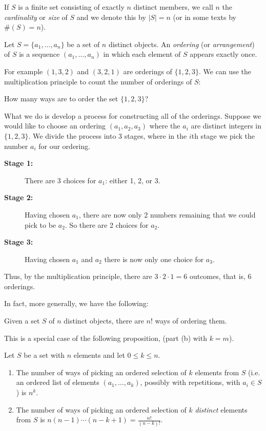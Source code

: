 \documentclass[11pt,dvipsnames]{book}
\numberwithin{figure}{section} %
\numberwithin{table}{section} %
\begin{document}
If $S$ is a finite set consisting of exactly $n$ distinct members, we call $n$ the {\em cardinality}
or {\em size} of $S$ and we denote this by $|S| = n$ (or in some texts by $\#(S) =n$).

\begin{definition}
Let $S = \{a_1, \dots , a_n\}$ be a set of $n$ distinct objects. An {\it ordering} (or {\it arrangement}) of $S$ is a sequence $(a_{1}, \dots ,a_{n})$ in which each element of $S$ appears exactly once.
\end{definition}

For example $(1,3,2)$ and $(3,2,1)$ are orderings of $\{1,2,3\}$. We can use the multiplication principle to count the number of orderings of $S$:

\begin{example}
How many ways are to order the set $\{1,2,3\}$?

What we do is develop a process for constructing all of the orderings. Suppose we would like to choose an ordering $(a_{1},a_{2},a_{3})$ where the $a_{i}$ are distinct integers in $\{1, 2, 3\}$. We divide the process into 3 stages, where in the $i$th stage we pick the number $a_{i}$ for our ordering.
\begin{description}
\item[\bf Stage 1:] There are $3$ choices for $a_{1}$: either 1, 2, or 3.
\item[\bf Stage 2:] Having chosen $a_{1}$, there are now only 2 numbers remaining that we could pick to be $a_{2}$. So there are 2 choices for $a_2$.
\item[\bf Stage 3:] Having chosen $a_{1}$ and $a_{2}$ there is now only one choice for $a_{3}$.
\end{description}
\medskip
Thus, by the multiplication principle, there are $3\cdot 2\cdot 1 = 6$ outcomes, that is, $6$ orderings.
\end{example}

In fact, more generally, we have the following:

\begin{theorem}
Given a set $S$ of $n$ distinct objects, there are $n!$ ways of ordering them.
\end{theorem}

This is a special case of the following proposition, (part (b) with $k=m$).

\begin{proposition}
\label{p:n^k}
Let $S$ be a set with $n$ elements and let $0\leq k\leq n$.
\begin{enumerate}[label=(\alph*)]
\item The number of ways of picking an ordered selection of $k$ elements from $S$ (i.e. an ordered list of elements $(a_{1}, \dots ,a_{k})$, possibly with repetitions, with $a_i\in S$) is $n^{k}$.
\item The number of ways of picking an ordered selection of $k$ {\it distinct} elements from $S$ is $n(n-1)\cdots (n-k+1) = \frac{n!}{(n-k)!}$.
\end{enumerate}
\end{proposition}
\end{document}

